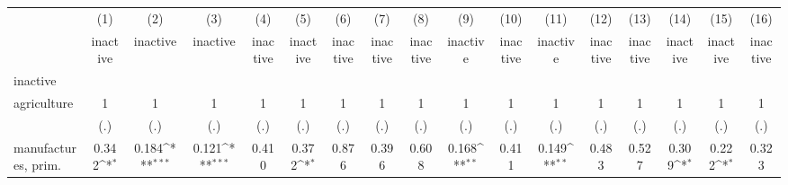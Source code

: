 {
\def\sym#1{\ifmmode^{#1}\else\(^{#1}\)\fi}
\begin{tabular}{l*{16}{c}}
\hline\hline
                    &\multicolumn{1}{c}{(1)}&\multicolumn{1}{c}{(2)}&\multicolumn{1}{c}{(3)}&\multicolumn{1}{c}{(4)}&\multicolumn{1}{c}{(5)}&\multicolumn{1}{c}{(6)}&\multicolumn{1}{c}{(7)}&\multicolumn{1}{c}{(8)}&\multicolumn{1}{c}{(9)}&\multicolumn{1}{c}{(10)}&\multicolumn{1}{c}{(11)}&\multicolumn{1}{c}{(12)}&\multicolumn{1}{c}{(13)}&\multicolumn{1}{c}{(14)}&\multicolumn{1}{c}{(15)}&\multicolumn{1}{c}{(16)}\\
                    &\multicolumn{1}{c}{inactive}&\multicolumn{1}{c}{inactive}&\multicolumn{1}{c}{inactive}&\multicolumn{1}{c}{inactive}&\multicolumn{1}{c}{inactive}&\multicolumn{1}{c}{inactive}&\multicolumn{1}{c}{inactive}&\multicolumn{1}{c}{inactive}&\multicolumn{1}{c}{inactive}&\multicolumn{1}{c}{inactive}&\multicolumn{1}{c}{inactive}&\multicolumn{1}{c}{inactive}&\multicolumn{1}{c}{inactive}&\multicolumn{1}{c}{inactive}&\multicolumn{1}{c}{inactive}&\multicolumn{1}{c}{inactive}\\
\hline
inactive            &                     &                     &                     &                     &                     &                     &                     &                     &                     &                     &                     &                     &                     &                     &                     &                     \\
agriculture         &           1         &           1         &           1         &           1         &           1         &           1         &           1         &           1         &           1         &           1         &           1         &           1         &           1         &           1         &           1         &           1         \\
                    &         (.)         &         (.)         &         (.)         &         (.)         &         (.)         &         (.)         &         (.)         &         (.)         &         (.)         &         (.)         &         (.)         &         (.)         &         (.)         &         (.)         &         (.)         &         (.)         \\
[1em]
manufactures, prim. &       0.342\sym{*}  &       0.184\sym{***}&       0.121\sym{***}&       0.410         &       0.372\sym{*}  &       0.876         &       0.396         &       0.608         &       0.168\sym{**} &       0.411         &       0.149\sym{**} &       0.483         &       0.527         &       0.309\sym{*}  &       0.222\sym{*}  &       0.323         \\

\end{tabular}}
